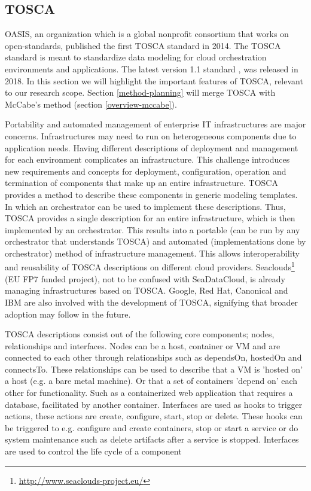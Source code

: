 \subsection{TOSCA}
\label{overview-tosca}
OASIS, an organization which is a global nonprofit consortium that works on open-standards, published the first TOSCA standard in 2014. The TOSCA standard is meant to standardize data modeling for cloud orchestration environments and applications. The latest version 1.1 standard \cite{tosca-standard}, was released in 2018. In this section we will highlight the important features of TOSCA, relevant to our research scope. Section \ref{method-planning} will merge TOSCA with McCabe's method (section \ref{overview-mccabe}).

Portability and automated management of enterprise IT infrastructures are major concerns. Infrastructures may need to run on heterogeneous components due to application needs. Having different descriptions of deployment and management for each environment complicates an infrastructure. This challenge introduces new requirements and concepts for deployment, configuration, operation and termination of components that make up an entire infrastructure. TOSCA provides a method to describe these components in generic modeling templates. In which an orchestrator can be used to implement these descriptions. Thus, TOSCA provides a single description for an entire infrastructure, which is then implemented by an orchestrator. This results into a portable (can be run by any orchestrator that understands TOSCA) and automated (implementations done by orchestrator) method of infrastructure management. This allows interoperability and reusability of TOSCA descriptions on different cloud providers. Seaclouds\footnote{\url{http://www.seaclouds-project.eu/}} (EU FP7 funded project), not to be confused with SeaDataCloud, is already managing infrastructures based on TOSCA. Google, Red Hat, Canonical and IBM are also involved with the development of TOSCA, signifying that broader adoption may follow in the future.

TOSCA descriptions consist out of the following core components; nodes, relationships and interfaces. Nodes can be a host, container or VM and are connected to each other through relationships such as dependsOn, hostedOn and connectsTo. These relationships can be used to describe that a VM is 'hosted on' a host (e.g. a bare metal machine). Or that a set of containers 'depend on' each other for functionality. Such as a containerized web application that requires a database, facilitated by another container. Interfaces are used as hooks to trigger actions, these actions are create, configure, start, stop or delete. These hooks can be triggered to e.g. configure and create containers, stop or start a service or do system maintenance such as delete artifacts after a service is stopped. Interfaces are used to control the life cycle of a component 

